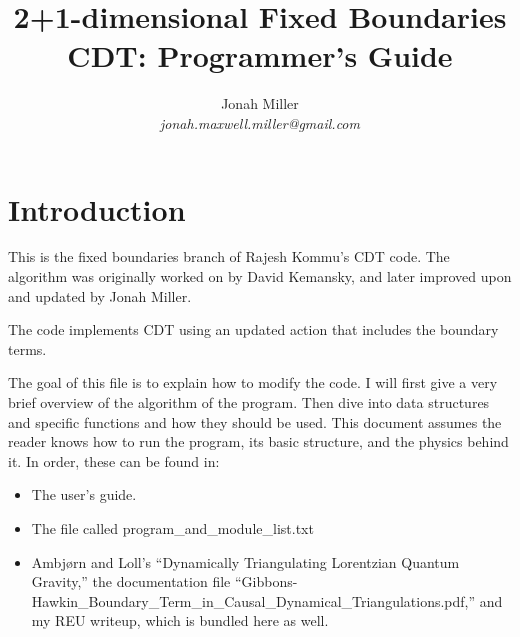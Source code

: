 \message{ !name(programmers_guide.tex)}\documentclass[12pt]{article}
\author{Jonah Miller\\
\textit{jonah.maxwell.miller@gmail.com}}
\title{2+1-dimensional Fixed Boundaries CDT: Programmer's Guide}
\begin{document}

\maketitle

\section{Introduction}
\label{s:intro}

This is the fixed boundaries branch of Rajesh Kommu's CDT code. The
algorithm was originally worked on by David Kemansky, and later
improved upon and updated by Jonah Miller.

The code implements CDT using an updated action that includes the
boundary terms.

The goal of this file is to explain how to modify the code. I will
first give a very brief overview of the algorithm of the program. Then
dive into data structures and specific functions and how they should
be used. This document assumes the reader knows how to run the
program, its basic structure, and the physics behind it. In order,
these can be found in:
\begin{itemize}
\item The user's guide.
\item The file called program\_and\_module\_list.txt
\item Ambj\o rn and Loll's ``Dynamically Triangulating Lorentzian
  Quantum Gravity,'' the documentation file
  ``Gibbons-Hawkin\_Boundary\_Term\_in\_Causal\_Dynamical\_Triangulations.pdf,''
  and my REU writeup, which is bundled here as well.
\end{itemize}
\end{document}
